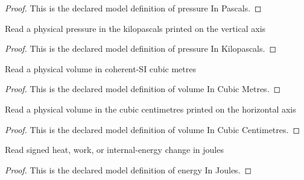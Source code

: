 \begin{proof}
  This is the declared model definition of pressure In Pascals.
\end{proof}
\begin{definition}
  \label{def:physics:phyx-mini-0479:phyxminiproblems-problemphyxmini0479-pressureinkilopascals}
  Read a physical pressure in the kilopascals printed on the vertical axis
\end{definition}
\begin{proof}
  This is the declared model definition of pressure In Kilopascals.
\end{proof}
\begin{definition}
  \label{def:physics:phyx-mini-0479:phyxminiproblems-problemphyxmini0479-volumeincubicmetres}
  Read a physical volume in coherent-SI cubic metres
\end{definition}
\begin{proof}
  This is the declared model definition of volume In Cubic Metres.
\end{proof}
\begin{definition}
  \label{def:physics:phyx-mini-0479:phyxminiproblems-problemphyxmini0479-volumeincubiccentimetres}
  Read a physical volume in the cubic centimetres printed on the horizontal axis
\end{definition}
\begin{proof}
  This is the declared model definition of volume In Cubic Centimetres.
\end{proof}
\begin{definition}
  \label{def:physics:phyx-mini-0479:phyxminiproblems-problemphyxmini0479-energyinjoules}
  Read signed heat, work, or internal-energy change in joules
\end{definition}
\begin{proof}
  This is the declared model definition of energy In Joules.
\end{proof}
